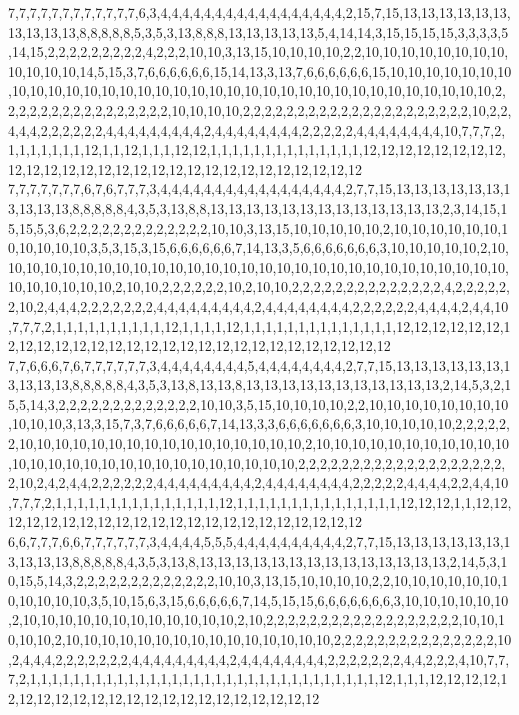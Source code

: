 7,7,7,7,7,7,7,7,7,7,7,7,6,3,4,4,4,4,4,4,4,4,4,4,4,4,4,4,4,4,4,2,15,7,15,13,13,13,13,13,13,13,13,13,13,8,8,8,8,8,5,3,5,3,13,8,8,8,13,13,13,13,13,5,4,14,14,3,15,15,15,15,3,3,3,3,5,14,15,2,2,2,2,2,2,2,2,2,4,2,2,2,10,10,3,13,15,10,10,10,10,2,2,10,10,10,10,10,10,10,10,10,10,10,10,14,5,15,3,7,6,6,6,6,6,6,15,14,13,3,13,7,6,6,6,6,6,6,15,10,10,10,10,10,10,10,10,10,10,10,10,10,10,10,10,10,10,10,10,10,10,10,10,10,10,10,10,10,10,10,10,10,10,2,2,2,2,2,2,2,2,2,2,2,2,2,2,2,2,10,10,10,10,2,2,2,2,2,2,2,2,2,2,2,2,2,2,2,2,2,2,2,2,2,10,2,2,4,4,4,2,2,2,2,2,2,4,4,4,4,4,4,4,4,4,2,4,4,4,4,4,4,4,4,2,2,2,2,2,4,4,4,4,4,4,4,4,10,7,7,7,2,1,1,1,1,1,1,1,12,1,1,12,1,1,1,12,12,1,1,1,1,1,1,1,1,1,1,1,1,1,1,12,12,12,12,12,12,12,12,12,12,12,12,12,12,12,12,12,12,12,12,12,12,12,12,12,12,12,12
7,7,7,7,7,7,7,6,7,6,7,7,7,3,4,4,4,4,4,4,4,4,4,4,4,4,4,4,4,4,4,2,7,7,15,13,13,13,13,13,13,13,13,13,13,8,8,8,8,8,4,3,5,3,13,8,8,13,13,13,13,13,13,13,13,13,13,13,13,13,2,3,14,15,15,15,5,3,6,2,2,2,2,2,2,2,2,2,2,2,2,2,10,10,3,13,15,10,10,10,10,10,2,10,10,10,10,10,10,10,10,10,10,10,3,5,3,15,3,15,6,6,6,6,6,6,7,14,13,3,5,6,6,6,6,6,6,6,3,10,10,10,10,10,2,10,10,10,10,10,10,10,10,10,10,10,10,10,10,10,10,10,10,10,10,10,10,10,10,10,10,10,10,10,10,10,10,10,10,10,2,10,10,2,2,2,2,2,2,10,2,10,10,2,2,2,2,2,2,2,2,2,2,2,2,2,2,4,2,2,2,2,2,2,10,2,4,4,4,2,2,2,2,2,2,2,4,4,4,4,4,4,4,4,4,2,4,4,4,4,4,4,4,4,2,2,2,2,2,2,4,4,4,4,2,4,4,10,7,7,7,2,1,1,1,1,1,1,1,1,1,1,12,1,1,1,1,12,1,1,1,1,1,1,1,1,1,1,1,1,1,1,12,12,12,12,12,12,12,12,12,12,12,12,12,12,12,12,12,12,12,12,12,12,12,12,12,12,12,12
7,7,6,6,6,7,6,7,7,7,7,7,7,3,4,4,4,4,4,4,4,4,5,4,4,4,4,4,4,4,4,2,7,7,15,13,13,13,13,13,13,13,13,13,13,8,8,8,8,8,4,3,5,3,13,8,13,13,8,13,13,13,13,13,13,13,13,13,13,13,2,14,5,3,2,15,5,14,3,2,2,2,2,2,2,2,2,2,2,2,2,2,10,10,3,5,15,10,10,10,10,2,2,10,10,10,10,10,10,10,10,10,10,10,3,13,3,15,7,3,7,6,6,6,6,6,7,14,13,3,3,6,6,6,6,6,6,6,3,10,10,10,10,10,2,2,2,2,2,2,10,10,10,10,10,10,10,10,10,10,10,10,10,10,10,10,2,10,10,10,10,10,10,10,10,10,10,10,10,10,10,10,10,10,10,10,10,10,10,10,10,10,10,10,2,2,2,2,2,2,2,2,2,2,2,2,2,2,2,2,2,2,2,2,10,2,4,2,4,4,2,2,2,2,2,2,4,4,4,4,4,4,4,4,4,2,4,4,4,4,4,4,4,4,2,2,2,2,2,4,4,4,4,2,2,4,4,10,7,7,7,2,1,1,1,1,1,1,1,1,1,1,1,1,1,1,1,12,1,1,1,1,1,1,1,1,1,1,1,1,1,1,1,12,12,12,1,1,12,12,12,12,12,12,12,12,12,12,12,12,12,12,12,12,12,12,12,12,12,12
6,6,7,7,7,6,6,7,7,7,7,7,7,3,4,4,4,4,5,5,5,4,4,4,4,4,4,4,4,4,4,2,7,7,15,13,13,13,13,13,13,13,13,13,13,8,8,8,8,8,4,3,5,3,13,8,13,13,13,13,13,13,13,13,13,13,13,13,13,13,2,14,5,3,10,15,5,14,3,2,2,2,2,2,2,2,2,2,2,2,2,2,10,10,3,13,15,10,10,10,10,2,2,10,10,10,10,10,10,10,10,10,10,10,3,5,10,15,6,3,15,6,6,6,6,6,7,14,5,15,15,6,6,6,6,6,6,6,3,10,10,10,10,10,10,2,10,10,10,10,10,10,10,10,10,10,10,10,2,10,2,2,2,2,2,2,2,2,2,2,2,2,2,2,2,2,2,2,10,10,10,10,10,2,10,10,10,10,10,10,10,10,10,10,10,10,10,10,10,2,2,2,2,2,2,2,2,2,2,2,2,2,2,2,10,2,4,4,4,2,2,2,2,2,2,2,4,4,4,4,4,4,4,4,4,2,4,4,4,4,4,4,4,4,2,2,2,2,2,2,2,4,4,2,2,2,4,10,7,7,7,2,1,1,1,1,1,1,1,1,1,1,1,1,1,1,1,1,1,1,1,1,1,1,1,1,1,1,1,1,1,1,1,1,12,1,1,1,12,12,12,12,12,12,12,12,12,12,12,12,12,12,12,12,12,12,12,12,12,12
